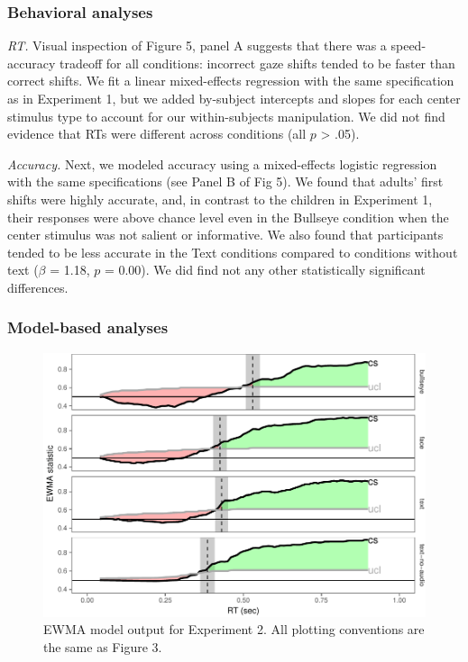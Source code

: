 \documentclass[english,man]{apa6}
\theoremstyle{definition}
\theoremstyle{definition}
\theoremstyle{definition}
\theoremstyle{remark}
\begin{document}
\hypertarget{behavioral-analyses-1}{%
\subsubsection{Behavioral analyses}\label{behavioral-analyses-1}}

\emph{RT.} Visual inspection of Figure 5, panel A suggests that there
was a speed-accuracy tradeoff for all conditions: incorrect gaze shifts
tended to be faster than correct shifts. We fit a linear mixed-effects
regression with the same specification as in Experiment 1, but we added
by-subject intercepts and slopes for each center stimulus type to
account for our within-subjects manipulation. We did not find evidence
that RTs were different across conditions (all \(p\) \textgreater{}
.05).

\emph{Accuracy.} Next, we modeled accuracy using a mixed-effects
logistic regression with the same specifications (see Panel B of Fig 5).
We found that adults' first shifts were highly accurate, and, in
contrast to the children in Experiment 1, their responses were above
chance level even in the Bullseye condition when the center stimulus was
not salient or informative. We also found that participants tended to be
less accurate in the Text conditions compared to conditions without text
(\(\beta\) = 1.18, \(p\) = 0.00). We did find not any other
statistically significant differences.

\hypertarget{model-based-analyses-1}{%
\subsubsection{Model-based analyses}\label{model-based-analyses-1}}

\begin{figure}[tb]

{\centering \includegraphics[width=0.8\linewidth]{figs/text-ewma-plot-1} 

}

\caption{EWMA model output for Experiment 2. All plotting conventions are the same as Figure 3.}\label{fig:text-ewma-plot}
\end{figure}
\end{document}
